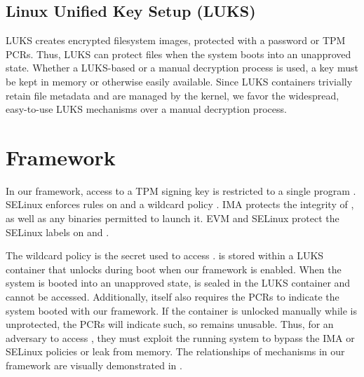 \documentclass[12pt,letterpaper]{kuthesis}
\newif\ifthesis
\begin{document}
\ifthesis\subsection{Setting up IMA and EVM}\fi

\subsection{Linux Unified Key Setup (LUKS)}
LUKS \cite{Fruhwirth:LUKS:2005} creates encrypted filesystem images, protected with a password or TPM PCRs.
Thus, LUKS can protect files when the system boots into an unapproved state.
Whether a LUKS-based or a manual decryption process is used, a key must be kept in memory or otherwise easily available.
Since LUKS containers trivially retain file metadata and are managed by the kernel,
we favor the widespread, easy-to-use LUKS mechanisms over a manual decryption process.

\section{Framework}\label{sec:implementation}
In our framework, access to a TPM signing key \pk is restricted to a single program \tpmsign.
SELinux enforces rules on \tpmsign and a wildcard policy \wcp.
IMA protects the integrity of \tpmsign, as well as any binaries permitted to launch it.
EVM and SELinux protect the SELinux labels on \tpmsign and \wcp.

The wildcard policy \wcp is the secret used to access \pk.
\wcp is stored within a LUKS container that unlocks during boot when our framework is enabled.
When the system is booted into an unapproved state, \wcp is sealed in the LUKS container and cannot be accessed.
Additionally, \wcp itself also requires the PCRs to indicate the system booted with our framework.
If the container is unlocked manually while \wcp is unprotected, the PCRs will indicate such, so \pk remains unusable.
Thus, for an adversary to access \wcp, they must exploit the running system to bypass the IMA or SELinux policies or leak \wcp from memory.
The relationships of mechanisms in our framework are visually demonstrated in .
\end{document}
